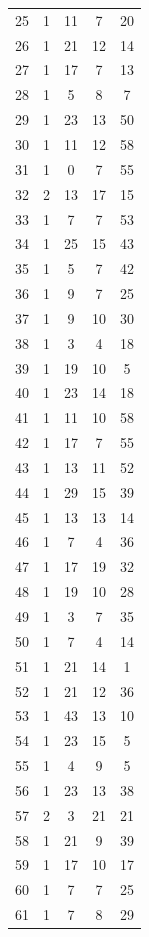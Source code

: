 \begin{appendices}
\begin{longtable}{lcccc}
25  &   1 &  11 &   7 &  20 \\
26  &   1 &  21 &  12 &  14 \\
27  &   1 &  17 &   7 &  13 \\
28  &   1 &   5 &   8 &   7 \\
29  &   1 &  23 &  13 &  50 \\
30  &   1 &  11 &  12 &  58 \\
31  &   1 &   0 &   7 &  55 \\
32  &   2 &  13 &  17 &  15 \\
33  &   1 &   7 &   7 &  53 \\
34  &   1 &  25 &  15 &  43 \\
35  &   1 &   5 &   7 &  42 \\
36  &   1 &   9 &   7 &  25 \\
37  &   1 &   9 &  10 &  30 \\
38  &   1 &   3 &   4 &  18 \\
39  &   1 &  19 &  10 &   5 \\
40  &   1 &  23 &  14 &  18 \\
41  &   1 &  11 &  10 &  58 \\
42  &   1 &  17 &   7 &  55 \\
43  &   1 &  13 &  11 &  52 \\
44  &   1 &  29 &  15 &  39 \\
45  &   1 &  13 &  13 &  14 \\
46  &   1 &   7 &   4 &  36 \\
47  &   1 &  17 &  19 &  32 \\
48  &   1 &  19 &  10 &  28 \\
49  &   1 &   3 &   7 &  35 \\
50  &   1 &   7 &   4 &  14 \\
51  &   1 &  21 &  14 &   1 \\
52  &   1 &  21 &  12 &  36 \\
53  &   1 &  43 &  13 &  10 \\
54  &   1 &  23 &  15 &   5 \\
55  &   1 &   4 &   9 &   5 \\
56  &   1 &  23 &  13 &  38 \\
57  &   2 &   3 &  21 &  21 \\
58  &   1 &  21 &   9 &  39 \\
59  &   1 &  17 &  10 &  17 \\
60  &   1 &   7 &   7 &  25 \\
61  &   1 &   7 &   8 &  29 \\

\end{longtable}
\end{appendices}
